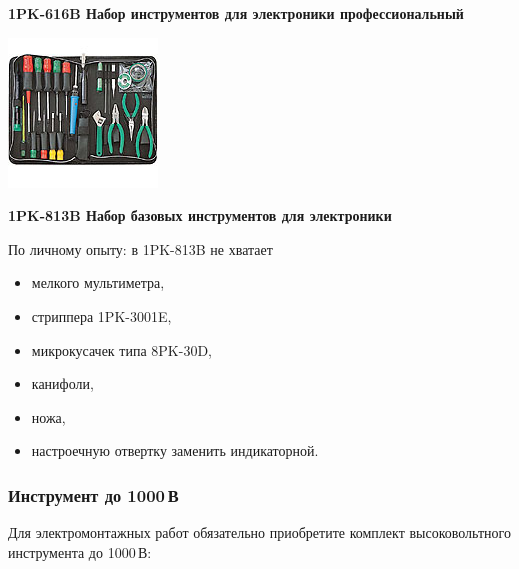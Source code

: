 \textbf{1PK-616B Набор инструментов для электроники профессиональный}

\clearpage\label{1PK-813B}
\noindent\includegraphics[height=0.95\textheight]{tech/tools/proskit/1PK-813B.jpg}

\textbf{1PK-813B Набор базовых инструментов для электроники}

\clearpage

По личному опыту: в 1PK-813B не хватает

\begin{itemize}
  \item мелкого мультиметра, 
  \item стриппера 1PK-3001E, 
  \item микрокусачек типа 8PK-30D, 
  \item канифоли, 
  \item ножа, 
  \item настроечную отвертку заменить индикаторной.
\end{itemize} 

\clearpage
\subsubsection{Инструмент до 1000\,В}

Для электромонтажных работ обязательно приобретите комплект
высоковольтного инструмента до 1000\,В:

